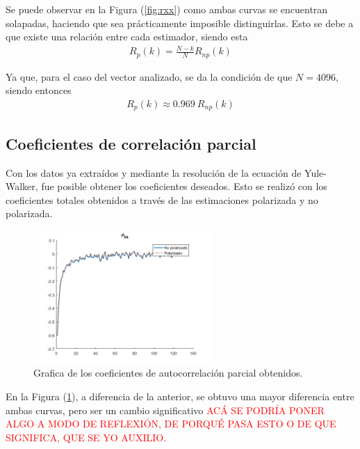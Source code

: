 Se puede observar en la Figura (\ref{fig:rxx}) como ambas curvas se encuentran solapadas, haciendo que sea prácticamente imposible distinguirlas.
Esto se debe a que existe una relación entre cada estimador, siendo esta
\begin{equation*}
\begin{gathered}
	R_{p}(k) = \frac{N - k}{N} R_{np}(k)
\end{gathered}
\end{equation*}

Ya que, para el caso del vector analizado, se da la condición de que $N = 4096$, siendo entonces
\begin{equation*}
\begin{gathered}
	R_{p}(k) \approx 0.969 \ R_{np}(k)
\end{gathered}
\end{equation*}

\subsection{Coeficientes de correlación parcial}

Con los datos ya extraídos y mediante la resolución de la ecuación de Yule-Walker, fue posible obtener los coeficientes deseados. Esto se realizó con los coeficientes totales obtenidos a través de las estimaciones polarizada y no polarizada.
\begin{figure}[H]
\centering
	\includegraphics[width=0.6\textwidth, trim = {0 0 0 0.7cm},clip]{./ImagenesEjercicio2/phikk.png}
	\caption{Grafica de los coeficientes de autocorrelación parcial obtenidos.}
	\label{fig:phikk}
\end{figure}

En la Figura (\ref{fig:phikk}), a diferencia de la anterior, se obtuvo una mayor diferencia entre ambas curvas, pero ser un cambio significativo \textcolor{red}{ACÁ SE PODRÍA PONER ALGO A MODO DE REFLEXIÓN, DE PORQUÉ PASA ESTO O DE QUE SIGNIFICA, QUE SE YO AUXILIO.}

